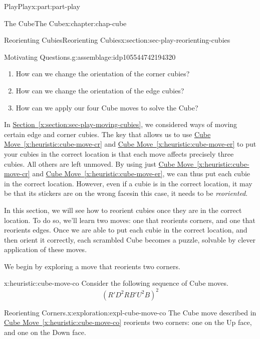 \documentclass[oneside,10pt,]{book}
\newcommand{\xreffont}{\relax}
\numberwithin{equation}{section}
\begin{document}
\begin{partptx}{Play}{}{Play}{}{}{x:part:part-play}
\begin{chapterptx}{The Cube}{}{The Cube}{}{}{x:chapter:chap-cube}
\begin{sectionptx}{Reorienting Cubies}{}{Reorienting Cubies}{}{}{x:section:sec-play-reorienting-cubies}
\begin{assemblage}{Motivating Questions.}{g:assemblage:idp105544742194320}
\begin{enumerate}
\item{}How can we change the orientation of the corner cubies?%
\item{}How can we change the orientation of the edge cubies?%
\item{}How can we apply our four Cube moves to solve the Cube?%
\end{enumerate}
%
\end{assemblage}
\begin{introduction}{}%
In \hyperref[x:section:sec-play-moving-cubies]{Section~{\xreffont\ref{x:section:sec-play-moving-cubies}}}, we considered ways of moving certain edge and corner cubies. The key that allows us to use \hyperref[x:heuristic:cube-move-cr]{Cube Move~{\xreffont\ref{x:heuristic:cube-move-cr}}} and \hyperref[x:heuristic:cube-move-er]{Cube Move~{\xreffont\ref{x:heuristic:cube-move-er}}} to put your cubies in the correct location is that each move affects precisely three cubies. All others are left unmoved. By using just \hyperref[x:heuristic:cube-move-cr]{Cube Move~{\xreffont\ref{x:heuristic:cube-move-cr}}} and \hyperref[x:heuristic:cube-move-er]{Cube Move~{\xreffont\ref{x:heuristic:cube-move-er}}}, we can thus put each cubie in the correct location. However, even if a cubie is in the correct location, it may be that its stickers are on the wrong faces\textemdash{}in this case, it needs to be \emph{reoriented}.%
\par
In this section, we will see how to reorient cubies once they are in the correct location. To do so, we'll learn two moves: one that reorients corners, and one that reorients edges. Once we are able to put each cubie in the correct location, and then orient it correctly, each scrambled Cube becomes a puzzle, solvable by clever application of these moves.%
\end{introduction}%
We begin by exploring a move that reorients two corners.%
\begin{heuristic}{}{}{x:heuristic:cube-move-co}%
%
Consider the following sequence of Cube moves.%
%
\begin{equation*}
(R' D^2 R B' U^2 B)^2
\end{equation*}
\end{heuristic}
\begin{exploration}{Reorienting Corners.}{x:exploration:expl-cube-move-co}%
The Cube move described in \hyperref[x:heuristic:cube-move-co]{Cube Move~{\xreffont\ref{x:heuristic:cube-move-co}}} reorients two corners: one on the Up face, and one on the Down face.%
%
\begin{enumerate}

\end{enumerate}
\end{exploration}
\end{sectionptx}
\end{chapterptx}
\end{partptx}
\end{document}
